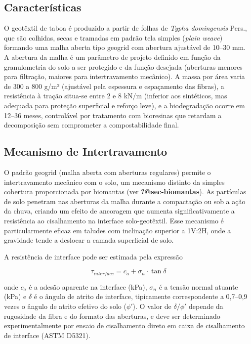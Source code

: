 \documentclass[
  portuguese,
  11pt,
  a4paper,
  open=any]{scrbook}
\begin{document}
\subsection{Características}\label{caracteruxedsticas}

O geotêxtil de taboa é produzido a partir de folhas de \emph{Typha
domingensis} Pers., que são colhidas, secas e tramadas em padrão tela
simples (\emph{plain weave}) formando uma malha aberta tipo geogrid com
abertura ajustável de 10--30 mm. A abertura da malha é um parâmetro de
projeto definido em função da granulometria do solo a ser protegido e da
função desejada (aberturas menores para filtração, maiores para
intertravamento mecânico). A massa por área varia de 300 a 800 g/m²
(ajustável pela espessura e espaçamento das fibras), a resistência à
tração situa-se entre 2 e 8 kN/m (inferior aos sintéticos, mas adequada
para proteção superficial e reforço leve), e a biodegradação ocorre em
12--36 meses, controlável por tratamento com bioresinas que retardam a
decomposição sem comprometer a compostabilidade final.

\subsection{Mecanismo de
Intertravamento}\label{mecanismo-de-intertravamento}

O padrão geogrid (malha aberta com aberturas regulares) permite o
intertravamento mecânico com o solo, um mecanismo distinto da simples
cobertura proporcionada por biomantas (ver \textbf{?@sec-biomantas}). As
partículas de solo penetram nas aberturas da malha durante a compactação
ou sob a ação da chuva, criando um efeito de ancoragem que aumenta
significativamente a resistência ao cisalhamento na interface
solo-geotêxtil. Esse mecanismo é particularmente eficaz em taludes com
inclinação superior a 1V:2H, onde a gravidade tende a deslocar a camada
superficial de solo.

A resistência de interface pode ser estimada pela expressão

\[
\tau_{interface} = c_a + \sigma_n \cdot \tan \delta
\]

onde \(c_a\) é a adesão aparente na interface (kPa), \(\sigma_n\) é a
tensão normal atuante (kPa) e \(\delta\) é o ângulo de atrito de
interface, tipicamente correspondente a 0,7--0,9 vezes o ângulo de
atrito efetivo do solo (\(\phi'\)). O valor de \(\delta/\phi'\) depende
da rugosidade da fibra e do formato das aberturas, e deve ser
determinado experimentalmente por ensaio de cisalhamento direto em caixa
de cisalhamento de interface (ASTM D5321).
\end{document}
